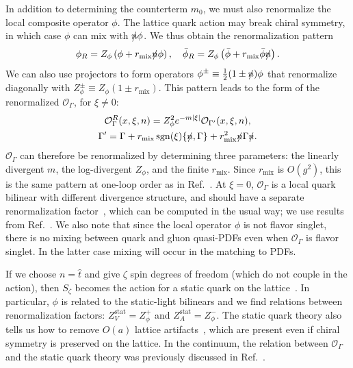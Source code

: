 \documentclass[prl,reprint,notitlepage,nofootinbib]{revtex4-1}
\DeclareMathOperator{\sgn}{sgn}
\newcommand{\cO}{\mathcal{O}}
\begin{document}
In addition to determining the counterterm $m_0$, we must also
renormalize the local composite operator $\phi$. The lattice quark
action may break chiral symmetry, in which case $\phi$ can mix with
$\slashed{n}\phi$. We thus obtain the renormalization pattern
\begin{equation}
  \phi_R = Z_\phi\left(\phi+r_\text{mix}\slashed{n}\phi\right),\quad
  \bar\phi_R = Z_\phi\left(\bar\phi+r_\text{mix}\bar\phi\slashed{n}\right).
\end{equation}
We can also use projectors to form operators
$\phi^\pm\equiv\frac{1}{2}(1\pm\slashed{n})\phi$ that renormalize
diagonally with $Z_\phi^\pm\equiv Z_\phi(1\pm r_\text{mix})$. This pattern
leads to the form of the renormalized $\cO_\Gamma$, for $\xi\neq 0$:
\begin{equation}
\begin{gathered}
  \cO_\Gamma^R(x,\xi,n) = Z_\phi^2e^{-m|\xi|}\cO_{\Gamma'}(x,\xi,n),\\
\Gamma' = \Gamma + r_\text{mix}\sgn(\xi)\{\slashed{n},\Gamma\} + r_\text{mix}^2\slashed{n}\Gamma\slashed{n}.
\end{gathered}
\end{equation}
$\cO_\Gamma$ can therefore be renormalized by determining three
parameters: the linearly divergent $m$, the log-divergent $Z_\phi$,
and the finite $r_\text{mix}$. Since $r_\text{mix}$ is $O(g^2)$, this
is the same pattern at one-loop order as in
Ref.~\cite{Constantinou:2017sej}. At $\xi=0$, $\cO_\Gamma$ is a local
quark bilinear with different divergence structure, and should have a
separate renormalization factor~\cite{Constantinou_privcomm}, which
can be computed in the usual way; we use results from
Ref.~\cite{Alexandrou:2015sea}. We also note that since the local
operator $\phi$ is not flavor singlet, there is no mixing between
quark and gluon quasi-PDFs even when $\cO_\Gamma$ is flavor singlet.
In the latter case mixing will occur in the matching to PDFs.

If we choose $n=\hat t$ and give $\zeta$ spin degrees of freedom
(which do not couple in the action), then $S_\zeta$ becomes the action
for a static quark on the
lattice~\cite{Eichten:1989zv,Sommer:2010ic}. In particular, $\phi$ is
related to the static-light bilinears and we find relations between
renormalization factors: $Z_V^\text{stat}=Z_\phi^+$ and
$Z_A^\text{stat}=Z_\phi^-$. The static quark theory also tells us how
to remove $O(a)$ lattice artifacts~\cite{Kurth:2000ki}, which are
present even if chiral symmetry is preserved on the lattice. In the
continuum, the relation between $\cO_\Gamma$ and the static quark
theory was previously discussed in Ref.~\cite{Ji:2015jwa}.
\end{document}
